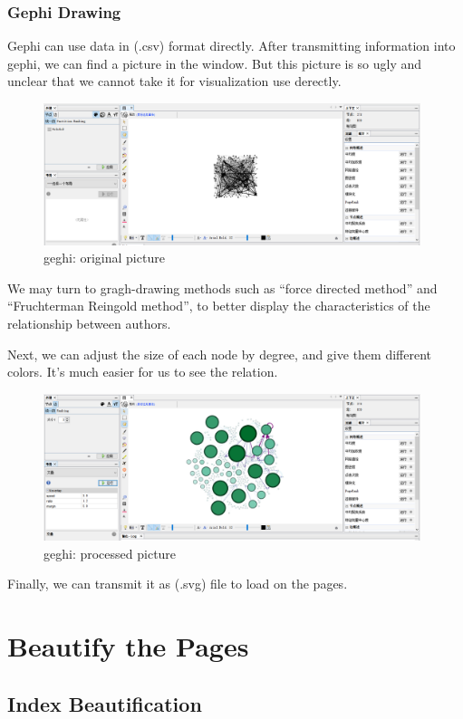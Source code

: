 \documentclass{book}
\begin{document}
\subsection{Gephi Drawing}

Gephi can use data in (.csv) format directly. After transmitting information into gephi, we can find a picture in the window. But this picture is so ugly and unclear that we cannot take it for visualization use derectly.  

\begin{figure}[H]
\centering
\includegraphics[width=11.0cm]{img/yhb_ge_1.png}
\caption{geghi: original picture}
\end{figure}
We may turn to gragh-drawing methods such as ``force directed method'' and ``Fruchterman Reingold method'', to better display the characteristics of the relationship between authors.

Next, we can adjust the  size of each node by degree, and give them different colors.
It's much easier for us to see the relation.
\begin{figure}[H]
\centering
\includegraphics[width=11.0cm]{img/yhb_ge_2.png}
\caption{geghi: processed picture}
\end{figure}
Finally, we can transmit it as (.svg) file to load on the pages.

\chapter {Beautify the Pages}


\section {Index Beautification}
\end{document}
